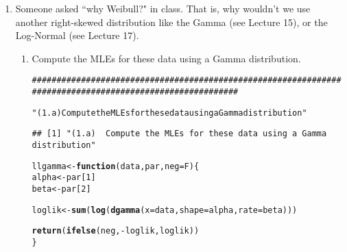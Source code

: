\documentclass{article}\usepackage[]{graphicx}\usepackage[]{xcolor}
\makeatletter
\newcommand{\hlnum}[1]{\textcolor[rgb]{0.686,0.059,0.569}{#1}}%
\newcommand{\hlsng}[1]{\textcolor[rgb]{0.192,0.494,0.8}{#1}}%
\newcommand{\hlcom}[1]{\textcolor[rgb]{0.678,0.584,0.686}{\textit{#1}}}%
\newcommand{\hlopt}[1]{\textcolor[rgb]{0,0,0}{#1}}%
\newcommand{\hldef}[1]{\textcolor[rgb]{0.345,0.345,0.345}{#1}}%
\newcommand{\hlkwa}[1]{\textcolor[rgb]{0.161,0.373,0.58}{\textbf{#1}}}%
\newcommand{\hlkwb}[1]{\textcolor[rgb]{0.69,0.353,0.396}{#1}}%
\newcommand{\hlkwc}[1]{\textcolor[rgb]{0.333,0.667,0.333}{#1}}%
\newcommand{\hlkwd}[1]{\textcolor[rgb]{0.737,0.353,0.396}{\textbf{#1}}}%
\newenvironment{kframe}{%
 \def\at@end@of@kframe{}%
 \ifinner\ifhmode%
  \def\at@end@of@kframe{\end{minipage}}%
  \begin{minipage}{\columnwidth}%
 \fi\fi%
 \def\FrameCommand##1{\hskip\@totalleftmargin \hskip-\fboxsep
 \colorbox{shadecolor}{##1}\hskip-\fboxsep
     \hskip-\linewidth \hskip-\@totalleftmargin \hskip\columnwidth}%
 \MakeFramed {\advance\hsize-\width
   \@totalleftmargin\z@ \linewidth\hsize
   \@setminipage}}%
 {\par\unskip\endMakeFramed%
 \at@end@of@kframe}
\newenvironment{knitrout}{}{} %
\makeatother
\begin{document}
\begin{enumerate}
  \item Someone asked ``why Weibull?" in class. That is, why wouldn't we use 
  another right-skewed distribution like the Gamma (see Lecture 15), or
  the Log-Normal (see Lecture 17).
  \begin{enumerate}
    \item Compute the MLEs for these data using a Gamma distribution. 


\begin{knitrout}\scriptsize
{}\color{fgcolor}\begin{kframe}
\begin{alltt}
\hlcom{#########################################################################################################}

\hlsng{"(1.a)  Compute the MLEs for these data using a Gamma distribution"}
\end{alltt}
\begin{verbatim}
## [1] "(1.a)  Compute the MLEs for these data using a Gamma distribution"
\end{verbatim}
\begin{alltt}
\hldef{llgamma} \hlkwb{<-} \hlkwa{function}\hldef{(}\hlkwc{data}\hldef{,} \hlkwc{par}\hldef{,} \hlkwc{neg}\hldef{=F)\{}
  \hldef{alpha} \hlkwb{<-} \hldef{par[}\hlnum{1}\hldef{]}
  \hldef{beta} \hlkwb{<-} \hldef{par[}\hlnum{2}\hldef{]}

  \hldef{loglik} \hlkwb{<-} \hlkwd{sum}\hldef{(}\hlkwd{log}\hldef{(}\hlkwd{dgamma}\hldef{(}\hlkwc{x}\hldef{=data,} \hlkwc{shape}\hldef{=alpha,} \hlkwc{rate}\hldef{=beta)))}

  \hlkwd{return}\hldef{(}\hlkwd{ifelse}\hldef{(neg,} \hlopt{-}\hldef{loglik, loglik))}
\hldef{\}}


\end{alltt}
\end{kframe}
\end{knitrout}
\end{enumerate}
\end{enumerate}
\end{document}
